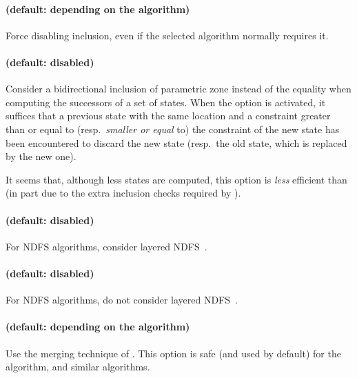 \paragraph{ (default: depending on the algorithm)}
Force disabling inclusion, even if the selected algorithm normally requires it.


\paragraph{ (default: disabled)}
Consider a bidirectional inclusion of parametric zone instead of the equality when computing the successors of a set of states.
When the  option is activated, it suffices that a previous state with the same location and a constraint greater than or equal to (resp.\ \emph{smaller or equal} to) the constraint of the new state has been encountered to discard the new state (resp.\ the old state, which is replaced by the new one).

It seems that, although less states are computed, this option is \emph{less} efficient than  (in part due to the extra inclusion checks required by ).


\paragraph{ (default: disabled)}
For NDFS algorithms, consider layered NDFS~\cite{NPP18}.

\paragraph{ (default: disabled)}
For NDFS algorithms, do not consider layered NDFS~\cite{NPP18}.


\paragraph{ (default: depending on the algorithm)}
Use the merging technique of \cite{AFS13atva}.
This option is safe (and used by default) for the \EFsynth{} algorithm, and similar algorithms.

